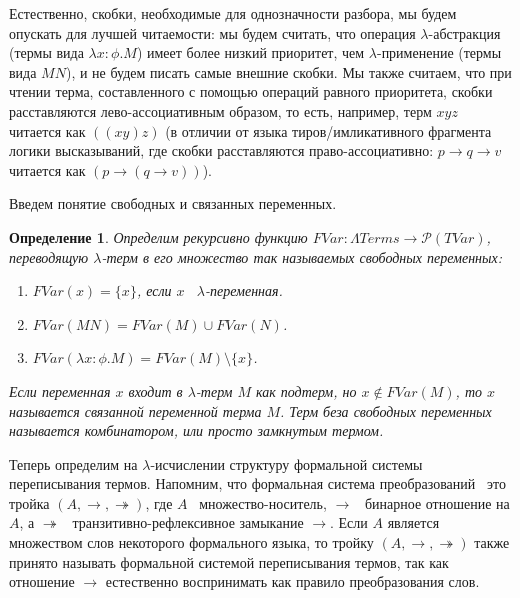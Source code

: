 \documentclass{article}[14pt]
\newtheorem{definition}{Определение}
\newcommand{\dash}{\textemdash\ }
\begin{document}
Естественно, скобки, необходимые для однозначности разбора, мы будем опускать для лучшей читаемости:
мы будем считать, что операция $\lambda$-абстракция (термы вида $\lambda x : \phi . M$) имеет более
низкий приоритет, чем $\lambda$-применение (термы вида $MN$), и не будем писать самые внешние скобки.
Мы также считаем, что при чтении терма, составленного с помощью операций равного приоритета,
скобки расставляются лево-ассоциативным образом, то есть, например, терм $xyz$ читается как $((xy)z)$
(в отличии от языка тиров/имликативного фрагмента логики высказываний, где скобки расставляются
право-ассоциативно: $p \rightarrow q \rightarrow v$ читается как $(p \rightarrow (q \rightarrow v))$).

Введем понятие свободных и связанных переменных.
\begin{definition}
    Определим рекурсивно функцию $FVar : \Lambda Terms \rightarrow \mathcal{P}(TVar)$,
    переводящую $\lambda$-терм в его множество так называемых свободных переменных:
    \begin{enumerate}
        \item $FVar(x) = \{ x \}$, если $x$ \dash $\lambda$-переменная.
        \item $FVar(MN) = FVar(M) \cup FVar(N)$.
        \item $FVar(\lambda x : \phi . M) = FVar(M) \setminus \{ x \}$.
    \end{enumerate}
    Если переменная $x$ входит в $\lambda$-терм $M$ как подтерм, но $x \not \in FVar(M)$, то $x$
    называется связанной переменной терма $M$. Терм беза свободных переменных называется
    комбинатором, или просто замкнутым термом.
\end{definition}

Теперь определим на $\lambda$-исчислении структуру формальной системы переписывания термов.
Напомним, что формальная система преобразований \dash это тройка $(A, \rightarrow, \twoheadrightarrow)$,
где $A$ \dash множество-носитель, $\rightarrow$ \dash бинарное отношение на $A$, а
$\twoheadrightarrow$ \dash транзитивно-рефлексивное замыкание $\rightarrow$. Если $A$ является
множеством слов некоторого формального языка, то тройку $(A, \rightarrow, \twoheadrightarrow)$ также
принято называть формальной системой переписывания термов, так как отношение $\rightarrow$
естественно воспринимать как правило преобразования слов.
\end{document}
